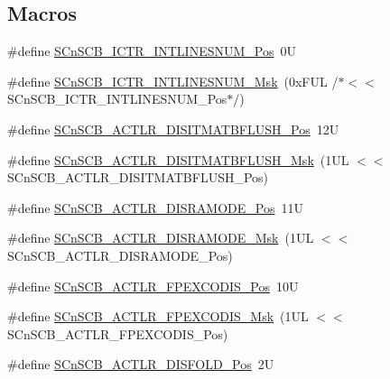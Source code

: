 \subsection*{Macros}
\begin{DoxyCompactItemize}
\item 
\#define \mbox{\hyperlink{group__CMSIS__SCnSCB_ga0777ddf379af50f9ca41d40573bfffc5}{S\+Cn\+S\+C\+B\+\_\+\+I\+C\+T\+R\+\_\+\+I\+N\+T\+L\+I\+N\+E\+S\+N\+U\+M\+\_\+\+Pos}}~0U
\item 
\#define \mbox{\hyperlink{group__CMSIS__SCnSCB_ga3efa0f5210051464e1034b19fc7b33c7}{S\+Cn\+S\+C\+B\+\_\+\+I\+C\+T\+R\+\_\+\+I\+N\+T\+L\+I\+N\+E\+S\+N\+U\+M\+\_\+\+Msk}}~(0x\+F\+U\+L /$\ast$$<$$<$ S\+Cn\+S\+C\+B\+\_\+\+I\+C\+T\+R\+\_\+\+I\+N\+T\+L\+I\+N\+E\+S\+N\+U\+M\+\_\+\+Pos$\ast$/)
\item 
\#define \mbox{\hyperlink{group__CMSIS__SCnSCB_ga5f888e0ebc18cc2d99976405777c142f}{S\+Cn\+S\+C\+B\+\_\+\+A\+C\+T\+L\+R\+\_\+\+D\+I\+S\+I\+T\+M\+A\+T\+B\+F\+L\+U\+S\+H\+\_\+\+Pos}}~12U
\item 
\#define \mbox{\hyperlink{group__CMSIS__SCnSCB_ga46b16a03b408184720134ef42203ac2e}{S\+Cn\+S\+C\+B\+\_\+\+A\+C\+T\+L\+R\+\_\+\+D\+I\+S\+I\+T\+M\+A\+T\+B\+F\+L\+U\+S\+H\+\_\+\+Msk}}~(1\+U\+L $<$$<$ S\+Cn\+S\+C\+B\+\_\+\+A\+C\+T\+L\+R\+\_\+\+D\+I\+S\+I\+T\+M\+A\+T\+B\+F\+L\+U\+S\+H\+\_\+\+Pos)
\item 
\#define \mbox{\hyperlink{group__CMSIS__SCnSCB_ga1bffb5e05053d15cbe42fbe87d225dcb}{S\+Cn\+S\+C\+B\+\_\+\+A\+C\+T\+L\+R\+\_\+\+D\+I\+S\+R\+A\+M\+O\+D\+E\+\_\+\+Pos}}~11U
\item 
\#define \mbox{\hyperlink{group__CMSIS__SCnSCB_ga436fc1bd011b15c9585bb3ace5332ce3}{S\+Cn\+S\+C\+B\+\_\+\+A\+C\+T\+L\+R\+\_\+\+D\+I\+S\+R\+A\+M\+O\+D\+E\+\_\+\+Msk}}~(1\+U\+L $<$$<$ S\+Cn\+S\+C\+B\+\_\+\+A\+C\+T\+L\+R\+\_\+\+D\+I\+S\+R\+A\+M\+O\+D\+E\+\_\+\+Pos)
\item 
\#define \mbox{\hyperlink{group__CMSIS__SCnSCB_gaa743743f5af93d6ece74a426b355ab70}{S\+Cn\+S\+C\+B\+\_\+\+A\+C\+T\+L\+R\+\_\+\+F\+P\+E\+X\+C\+O\+D\+I\+S\+\_\+\+Pos}}~10U
\item 
\#define \mbox{\hyperlink{group__CMSIS__SCnSCB_gadd12baaeeea3220b03867e4b8a1432aa}{S\+Cn\+S\+C\+B\+\_\+\+A\+C\+T\+L\+R\+\_\+\+F\+P\+E\+X\+C\+O\+D\+I\+S\+\_\+\+Msk}}~(1\+U\+L $<$$<$ S\+Cn\+S\+C\+B\+\_\+\+A\+C\+T\+L\+R\+\_\+\+F\+P\+E\+X\+C\+O\+D\+I\+S\+\_\+\+Pos)
\item 
\#define \mbox{\hyperlink{group__CMSIS__SCnSCB_gaab395870643a0bee78906bb15ca5bd02}{S\+Cn\+S\+C\+B\+\_\+\+A\+C\+T\+L\+R\+\_\+\+D\+I\+S\+F\+O\+L\+D\+\_\+\+Pos}}~2U
$$
\end{DoxyCompactItemize}
